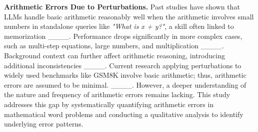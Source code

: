 



\noindent \textbf{Arithmetic Errors Due to Perturbations.} Past studies have shown that LLMs handle basic arithmetic reasonably well when the arithmetic involves small numbers in standalone queries like \textit{"What is x + y?"}, a skill often linked to memorization ____. Performance drops significantly in more complex cases, such as multi-step equations, large numbers, and multiplication ____. Background context can further affect arithmetic reasoning, introducing additional inconsistencies ____. 
Current research applying perturbations to widely used benchmarks like GSM8K involve basic arithmetic; thus, arithmetic errors are assumed to be minimal. ____.  However, a deeper understanding of the nature and frequency of arithmetic errors remains lacking. This study addresses this gap by systematically quantifying arithmetic errors in mathematical word problems and conducting a qualitative analysis to identify underlying error patterns.